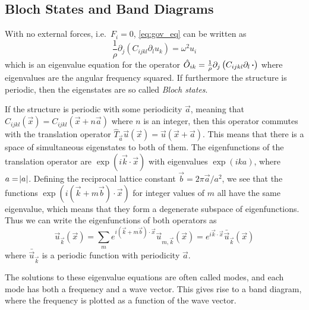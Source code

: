 \subsection{Bloch States and Band Diagrams}

With no external forces, i.e.\ $F_i = 0$, \cref{eq:gov_eq} can be written as
\begin{equation}
	\frac 1 \rho \partial_j \left(C_{ijkl} \partial_l u_k\right) = \omega^2 u_i
\end{equation}
which is an eigenvalue equation for the operator
$\hat O_{ik} = \frac 1 \rho\partial_j \left(C_{ijkl} \partial_l \operatorname{\boldsymbol{\cdot}}\right)$
where eigenvalues are the angular frequency squared.
If furthermore the structure is periodic, then the eigenstates are so called
\emph{Bloch states}.

If the structure is periodic with some periodicity $\vec a$,
meaning that $C_{ijkl}(\vec x) = C_{ijkl}(\vec x + n \vec a)$ where $n$ is an
integer, then this operator commutes with the translation operator
$\hat T_{\vec a} \vec u(\vec x) = \vec u(\vec x + \vec a)$.
This means that there is a space of simultaneous eigenstates to both of them.
The eigenfunctions of the translation operator are $\exp(i \vec k \cdot \vec
x)$ with eigenvalues $\exp(i k a)$, where $a = \abs{a}$.
Defining the reciprocal lattice constant $\vec b = 2 \pi \vec a / a^2$, we see
that the functions $\exp(i (\vec k + m \vec b) \cdot \vec x)$ for integer values
of $m$ all have the same eigenvalue, which means that they form a degenerate
subspace of eigenfunctions.
Thus we can write the eigenfunctions of both operators as
\begin{equation}
	\vec u_{\vec k}(\vec x) = \sum_m e^{i (\vec k + m \vec b) \cdot \vec x}
	\vec u_{m, \vec k}(\vec x)
	= e^{i \vec k \cdot \vec x} \bar{\vec u}_{\vec k}(\vec x)
\end{equation}
where $\bar{\vec{u}}_{\vec{k}}$ is a periodic function with periodicity $\vec a$.

The solutions to these eigenvalue equations are often called modes, and each
mode has both a frequency and a wave vector. This gives rise to a band diagram,
where the frequency is plotted as a function of the wave vector.

